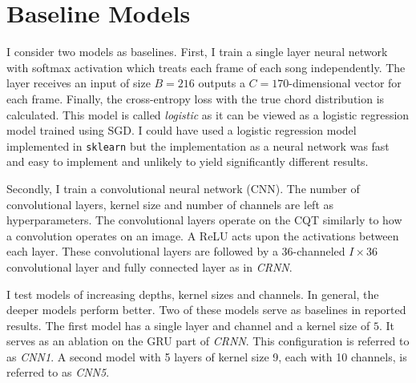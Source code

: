 \section{Baseline Models}\label{sec:baselines}

I consider two models as baselines. First, I train a single layer neural network with softmax activation which treats each frame of each song independently. The layer receives an input of size $B=216$ outputs a $C=170$-dimensional vector for each frame. Finally, the cross-entropy loss with the true chord distribution is calculated. This model is called \emph{logistic} as it can be viewed as a logistic regression model trained using SGD. I could have used a logistic regression model implemented in \texttt{sklearn} but the implementation as a neural network was fast and easy to implement and unlikely to yield significantly different results.


Secondly, I train a convolutional neural network (CNN). The number of convolutional layers, kernel size and number of channels are left as hyperparameters. The convolutional layers operate on the CQT similarly to how a convolution operates on an image. A ReLU acts upon the activations between each layer. These convolutional layers are followed by a 36-channeled $I\times 36$ convolutional layer and fully connected layer as in \emph{CRNN}. 

I test models of increasing depths, kernel sizes and channels. In general, the deeper models perform better. Two of these models serve as baselines in reported results. The first model has a single layer and channel and a kernel size of $5$. It serves as an ablation on the GRU part of \emph{CRNN}. This configuration is referred to as \emph{CNN1}. A second model with 5 layers of kernel size 9, each with 10 channels, is referred to as \emph{CNN5}.

